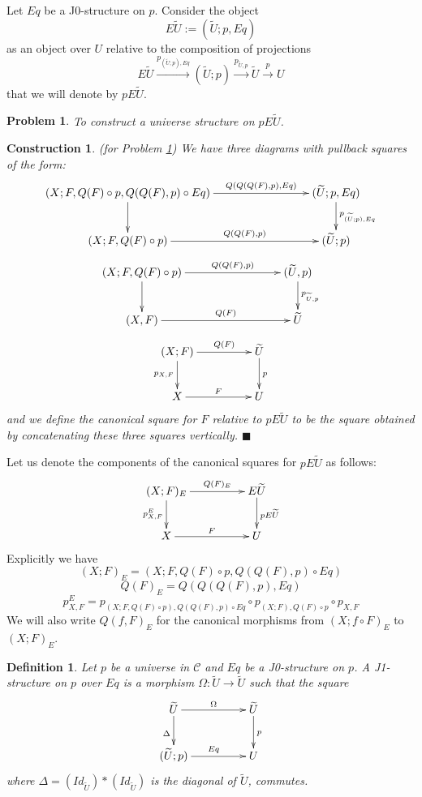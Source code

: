 \documentclass[12pt]{article}
\numberwithin{equation}{section}
\newenvironment{eq}{\begin{equation}}{\end{equation}}
\newtheorem{definition}[proposition]{Definition}
\newtheorem{problem}[proposition]{Problem}
\newtheorem{construction0}[proposition]{Construction}
\newenvironment{construction}[1]{\begin{construction0}(for Problem \ref{#1})}{$\blacksquare$ \end{construction0}}
\newcommand{\llabel}[1]{\label{#1}}
\newcommand{\sr}{\rightarrow}
\newcommand{\lr}{\longrightarrow}
\newcommand{\wt}{\widetilde}
\begin{document}
Let $Eq$ be a J0-structure on $p$. Consider the object
%
$$E\wt{U}:=(\wt{U};p,Eq)$$
%
as an object over $U$ relative to the composition of projections
%
$$E\wt{U}\stackrel{p_{(\wt{U};p),Eq}}{\lr}(\wt{U};p)\stackrel{p_{\wt{U},p}}{\lr}
\wt{U}\stackrel{p}{\sr} U$$
%
that we will denote by $pE\wt{U}$.
%
\begin{problem}
\llabel{2015.05.08.prob1} To construct a universe structure on $pE\wt{U}$.
\end{problem}
%
\begin{construction}{2015.05.08.prob1}\rm
\llabel{2015.05.08.constr1} We have three diagrams with pullback squares of the
form:
%
$$
\begin{xy}
          \xymatrix@C=7pc{ (X;F,Q(F)\circ p, Q(Q(F),p)\circ Eq)
            \ar[r]^-{Q(Q(Q(F),p),Eq)} \ar[d] & (\wt{U}; p, Eq)
            \ar[d]^{p_{(\wt{U};p),Eq}}\\ (X;F,Q(F)\circ p) \ar[r]^-{Q(Q(F),p)}
            & (\wt{U};p) }
\end{xy}
$$
$$
\begin{xy}
          \xymatrix@C=7pc{ (X;F,Q(F)\circ p) \ar[r]^-{Q(Q(F),p)} \ar[d] &
            (\wt{U},p) \ar[d]^{p_{\wt{U},p}}\\ (X,F) \ar[r]^-{Q(F)} & \wt{U} }
\end{xy}
$$
$$
\begin{xy}
          \xymatrix@C=4pc{ (X;F) \ar[r]^-{Q(F)} \ar[d]_{p_{X,F}} & \wt{U}
            \ar[d]^{p}\\ X \ar[r]^{F} & U }
\end{xy}
$$
%
and we define the canonical square for $F$ relative to $pE\wt{U}$ to be the
square obtained by concatenating these three squares vertically.
\end{construction}
%
Let us denote the components of the canonical squares for $pE\wt{U}$ as
follows:
%
$$
\begin{xy}
          \xymatrix@C=4pc{ (X;F)_{E} \ar[r]^-{Q(F)_{E}} \ar[d]_{p^E_{X,F}} &
            E\wt{U} \ar[d]^{pE\wt{U}}\\ X \ar[r]^{F} & U }
\end{xy}
$$
%
Explicitly we have
%
$$(X;F)_{E}=(X;F,Q(F)\circ p, Q(Q(F),p)\circ Eq)$$
$$Q(F)_{E}=Q(Q(Q(F),p),Eq)$$
$$p_{X,F}^E=p_{(X;F,Q(F)\circ p),Q(Q(F),p)\circ Eq}\circ p_{(X;F),Q(F)\circ
  p}\circ p_{X,F}$$
%
We will also write $Q(f,F)_{E}$ for the canonical morphisms from $(X;f\circ
F)_{E}$ to $(X;F)_{E}$.
%
\begin{definition}
\llabel{2015.03.27.def5} Let $p$ be a universe in $\mathcal C$ and $Eq$ be a
J0-structure on $p$. A J1-structure on $p$ over $Eq$ is a morphism
$\Omega:\wt{U}\sr \wt{U}$ such that the square
%
\begin{eq}\llabel{2015.03.27.sq1}
\begin{xy}
          \xymatrix@C=4pc{ \wt{U} \ar[r]^-{\Omega} \ar[d]_{\Delta} & \wt{U}
            \ar[d]^{p}\\ (\wt{U};p) \ar[r]^{Eq} & U }
\end{xy}
\end{eq}
%
where $\Delta=(Id_{\wt{U}})*(Id_{\wt{U}})$ is the diagonal of $\wt{U}$,
commutes.
\end{definition}
%
\end{document}
